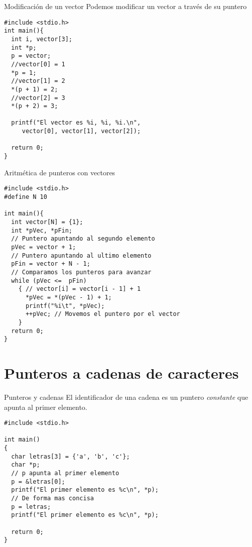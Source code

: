 \documentclass[xcolor={usenames,svgnames,dvipsnames}, aspectratio=169]{beamer}
\begin{document}
\begin{frame}[label={sec:org42bf517},fragile]{Modificación de un vector}
 Podemos modificar un vector a través de su puntero

\lstset{language=C,label= ,caption= ,captionpos=b,numbers=none}
\begin{lstlisting}
#include <stdio.h> 
int main(){
  int i, vector[3];
  int *p;
  p = vector;
  //vector[0] = 1
  *p = 1;
  //vector[1] = 2
  *(p + 1) = 2;
  //vector[2] = 3
  *(p + 2) = 3;

  printf("El vector es %i, %i, %i.\n",
	 vector[0], vector[1], vector[2]);
  
  return 0;
}
\end{lstlisting}
\end{frame}


\begin{frame}[label={sec:org2cf2319},fragile,plain]{Aritmética de punteros con vectores}
 \lstset{language=C,label= ,caption= ,captionpos=b,numbers=none}
\begin{lstlisting}
#include <stdio.h>
#define N 10

int main(){
  int vector[N] = {1};
  int *pVec, *pFin;
  // Puntero apuntando al segundo elemento
  pVec = vector + 1;
  // Puntero apuntando al ultimo elemento
  pFin = vector + N - 1;
  // Comparamos los punteros para avanzar
  while (pVec <=  pFin)
    { // vector[i] = vector[i - 1] + 1
      *pVec = *(pVec - 1) + 1; 
      printf("%i\t", *pVec);
      ++pVec; // Movemos el puntero por el vector
    }
  return 0;
} 
\end{lstlisting}
\end{frame}

\section{Punteros a cadenas de caracteres}
\label{sec:org834306e}

\begin{frame}[label={sec:org1f0468d},fragile]{Punteros y cadenas}
 El identificador de una cadena es un puntero \emph{constante} que apunta al primer elemento.

\lstset{language=C,label= ,caption= ,captionpos=b,numbers=none}
\begin{lstlisting}
#include <stdio.h>

int main()
{
  char letras[3] = {'a', 'b', 'c'};
  char *p;
  // p apunta al primer elemento 
  p = &letras[0];
  printf("El primer elemento es %c\n", *p);
  // De forma mas concisa
  p = letras;
  printf("El primer elemento es %c\n", *p);

  return 0;
}
\end{lstlisting}
\end{frame}
\end{document}
